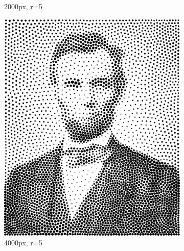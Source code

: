 \documentclass[11pt]{article}
\begin{document}
\begin{figure}[H]
\begin{subfigure}[b]{0.2\linewidth}
		\caption{2000px, r=5}
	\end{subfigure}
	\begin{subfigure}[b]{0.2\linewidth}
		\includegraphics[width=\linewidth]{pix/vr_AL_4000_r5.png}
		\caption{4000px, r=5}
	\end{subfigure}
	\begin{subfigure}[b]{0.2\linewidth}

\end{subfigure}
\end{figure}
\end{document}
